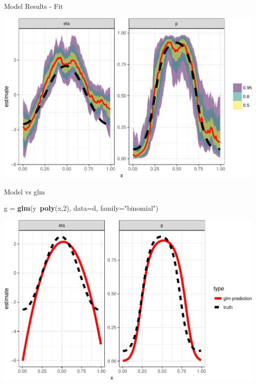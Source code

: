 \documentclass[11pt,ignorenonframetext,]{beamer}
\newenvironment{Shaded}{}{}
\newcommand{\DataTypeTok}[1]{\textcolor[rgb]{0.56,0.13,0.00}{#1}}
\newcommand{\DecValTok}[1]{\textcolor[rgb]{0.25,0.63,0.44}{#1}}
\newcommand{\KeywordTok}[1]{\textcolor[rgb]{0.00,0.44,0.13}{\textbf{#1}}}
\newcommand{\NormalTok}[1]{#1}
\newcommand{\OperatorTok}[1]{\textcolor[rgb]{0.40,0.40,0.40}{#1}}
\newcommand{\StringTok}[1]{\textcolor[rgb]{0.25,0.44,0.63}{#1}}
\let\oldShaded\Shaded
\let\endoldShaded\endShaded
\renewenvironment{Shaded}{\footnotesize\begin{spacing}{0.9}\oldShaded}{\endoldShaded\end{spacing}}
\begin{document}
\begin{frame}{Model Results - Fit}
\protect\hypertarget{model-results---fit}{}

\begin{center}\includegraphics[width=\textwidth]{Lec15_files/figure-beamer/make_pred-1} \end{center}

\end{frame}

\begin{frame}[fragile]{Model vs glm}
\protect\hypertarget{model-vs-glm}{}

\begin{Shaded}
\begin{Highlighting}[]
\NormalTok{g =}\StringTok{ }\KeywordTok{glm}\NormalTok{(y}\OperatorTok{~}\KeywordTok{poly}\NormalTok{(x,}\DecValTok{2}\NormalTok{), }\DataTypeTok{data=}\NormalTok{d, }\DataTypeTok{family=}\StringTok{"binomial"}\NormalTok{)}
\end{Highlighting}
\end{Shaded}

\begin{center}\includegraphics[width=\textwidth]{Lec15_files/figure-beamer/unnamed-chunk-4-1} \end{center}

\end{frame}
\end{document}

